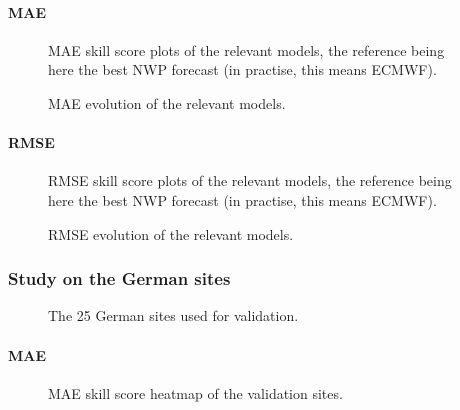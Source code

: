 \paragraph{MAE}
\begin{figure}[htb!]
    \centering
    
\caption{MAE skill score plots of the relevant models, the reference being here the best NWP forecast (in practise, this means ECMWF).}
\end{figure}

\begin{figure}[htb!]
    \centering
    
\caption{MAE evolution of the relevant models.}
\end{figure}


\paragraph{RMSE}
\begin{figure}[htb!]
    \centering
    
\caption{RMSE skill score plots of the relevant models, the reference being here the best NWP forecast (in practise, this means ECMWF).}
\end{figure}

\begin{figure}[htb!]
    \centering
    
\caption{RMSE evolution of the relevant models.}
\end{figure}

\subsubsection{Study on the German sites}

\begin{figure}[htb!]
    \centering
    
\caption{The 25 German sites used for validation.}

\end{figure}
\paragraph{MAE}
\begin{figure}[htb!]
    \centering
    
\caption{MAE skill score heatmap of the validation sites.}
\end{figure}
